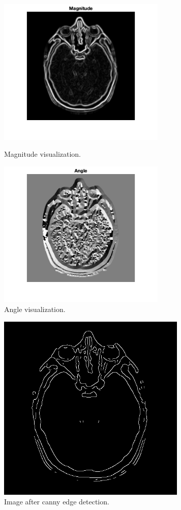 \documentclass[a4paper,11pt]{article}
\begin{document}
\begin{figure}[ht!]
    \begin{minipage}{0.5\textwidth}
        \centering
        \includegraphics[width=80mm]{magnitude.png}
        \caption{Magnitude visualization.}
    \end{minipage}\hfill
    \begin{minipage}{0.5\textwidth}
        \centering
        \includegraphics[width=80mm]{angle.png}
        \caption{Angle visualization.}
    \end{minipage}\hfill
\end{figure}
\noindent
\begin{figure}[ht!]
        \centering
        \includegraphics[width=90mm]{canny_edge.png}
        \caption{Image after canny edge detection.}
\end{figure}
\end{document}
